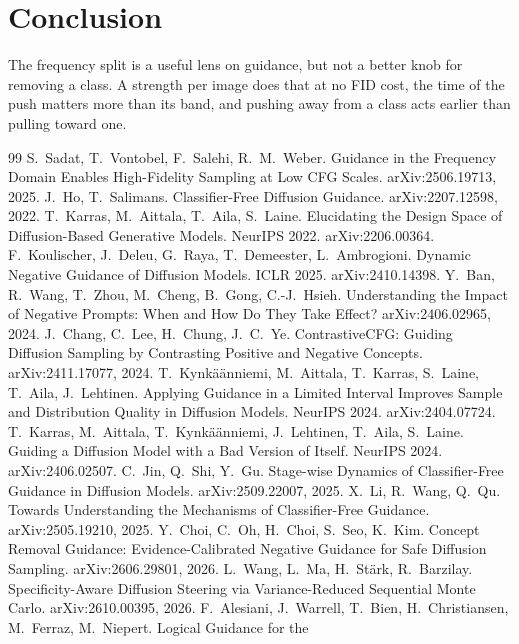 \documentclass[11pt]{article}
\begin{document}
\section{Conclusion}
\label{sec:conclusion}

The frequency split is a useful lens on guidance, but not a better knob for removing a class.
A strength per image does that at no FID cost, the time of the push matters more than its band, and pushing away from
a class acts earlier than pulling toward one.

\begin{thebibliography}{99}
\small
\setlength{\itemsep}{1pt}
 S.~Sadat, T.~Vontobel, F.~Salehi, R.~M.~Weber. Guidance in the Frequency Domain Enables High-Fidelity
  Sampling at Low CFG Scales. arXiv:2506.19713, 2025.
 J.~Ho, T.~Salimans. Classifier-Free Diffusion Guidance. arXiv:2207.12598, 2022.
 T.~Karras, M.~Aittala, T.~Aila, S.~Laine. Elucidating the Design Space of Diffusion-Based Generative
  Models. NeurIPS 2022. arXiv:2206.00364.
 F.~Koulischer, J.~Deleu, G.~Raya, T.~Demeester, L.~Ambrogioni. Dynamic Negative Guidance of Diffusion
  Models. ICLR 2025. arXiv:2410.14398.
 Y.~Ban, R.~Wang, T.~Zhou, M.~Cheng, B.~Gong, C.-J.~Hsieh. Understanding the Impact of Negative Prompts:
  When and How Do They Take Effect? arXiv:2406.02965, 2024.
 J.~Chang, C.~Lee, H.~Chung, J.~C.~Ye. ContrastiveCFG: Guiding Diffusion Sampling by Contrasting
  Positive and Negative Concepts. arXiv:2411.17077, 2024.
 T.~Kynk\"a\"anniemi, M.~Aittala, T.~Karras, S.~Laine, T.~Aila, J.~Lehtinen. Applying Guidance in a
  Limited Interval Improves Sample and Distribution Quality in Diffusion Models. NeurIPS 2024. arXiv:2404.07724.
 T.~Karras, M.~Aittala, T.~Kynk\"a\"anniemi, J.~Lehtinen, T.~Aila, S.~Laine. Guiding a
  Diffusion Model with a Bad Version of Itself. NeurIPS 2024. arXiv:2406.02507.
 C.~Jin, Q.~Shi, Y.~Gu. Stage-wise Dynamics of Classifier-Free Guidance in Diffusion Models.
  arXiv:2509.22007, 2025.
 X.~Li, R.~Wang, Q.~Qu. Towards Understanding the Mechanisms of Classifier-Free Guidance.
  arXiv:2505.19210, 2025.
 Y.~Choi, C.~Oh, H.~Choi, S.~Seo, K.~Kim. Concept Removal Guidance: Evidence-Calibrated Negative
  Guidance for Safe Diffusion Sampling. arXiv:2606.29801, 2026.
 L.~Wang, L.~Ma, H.~St\"ark, R.~Barzilay. Specificity-Aware Diffusion Steering via Variance-Reduced
  Sequential Monte Carlo. arXiv:2610.00395, 2026.
 F.~Alesiani, J.~Warrell, T.~Bien, H.~Christiansen, M.~Ferraz, M.~Niepert. Logical Guidance for the

\end{thebibliography}
\end{document}
